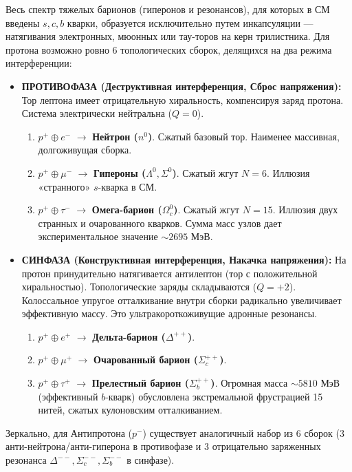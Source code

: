 \documentclass[11pt,a4paper]{article}
\begin{document}
Весь спектр тяжелых барионов (гиперонов и резонансов), для которых в СМ введены $s, c, b$ кварки, образуется исключительно путем инкапсуляции — натягивания электронных, мюонных или тау-торов на керн трилистника. Для протона возможно ровно 6 топологических сборок, делящихся на два режима интерференции:
\begin{itemize}
    \item \textbf{ПРОТИВОФАЗА (Деструктивная интерференция, Сброс напряжения):} Тор лептона имеет отрицательную хиральность, компенсируя заряд протона. Система электрически нейтральна ($Q=0$). 
    \begin{enumerate}
        \item $p^+ \oplus e^-$ $\longrightarrow$ \textbf{Нейтрон ($n^0$)}. Сжатый базовый тор. Наименее массивная, долгоживущая сборка.
        \item $p^+ \oplus \mu^-$ $\longrightarrow$ \textbf{Гипероны ($\Lambda^0, \Sigma^0$)}. Сжатый жгут $N=6$. Иллюзия «странного» $s$-кварка в СМ.
        \item $p^+ \oplus \tau^-$ $\longrightarrow$ \textbf{Омега-барион ($\Omega_c^0$)}. Сжатый жгут $N=15$. Иллюзия двух странных и очарованного кварков. Сумма масс узлов дает экспериментальное значение $\sim 2695$ МэВ.
    \end{enumerate}
    
    \item \textbf{СИНФАЗА (Конструктивная интерференция, Накачка напряжения):} На протон принудительно натягивается антилептон (тор с положительной хиральностью). Топологические заряды складываются ($Q=+2$). Колоссальное упругое отталкивание внутри сборки радикально увеличивает эффективную массу. Это ультракороткоживущие адронные резонансы.
    \begin{enumerate}
        \item $p^+ \oplus e^+$ $\longrightarrow$ \textbf{Дельта-барион ($\Delta^{++}$)}.
        \item $p^+ \oplus \mu^+$ $\longrightarrow$ \textbf{Очарованный барион ($\Sigma_c^{++}$)}.
        \item $p^+ \oplus \tau^+$ $\longrightarrow$ \textbf{Прелестный барион ($\Sigma_b^{++}$)}. Огромная масса $\sim 5810$ МэВ (эффективный $b$-кварк) обусловлена экстремальной фрустрацией 15 нитей, сжатых кулоновским отталкиванием.
    \end{enumerate}
\end{itemize}

Зеркально, для Антипротона ($p^-$) существует аналогичный набор из 6 сборок (3 анти-нейтрона/анти-гиперона в противофазе и 3 отрицательно заряженных резонанса $\Delta^{--}, \Sigma_c^{--}, \Sigma_b^{--}$ в синфазе). 
\end{document}
